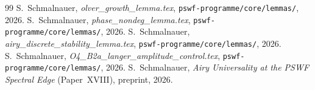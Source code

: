 \documentclass[12pt,a4paper]{amsart}
\theoremstyle{definition}
\begin{document}
\begin{thebibliography}{99}
S.~Schmalnauer,
\textit{olver\_growth\_lemma.tex},
\texttt{pswf-programme/core/lemmas/}, 2026.
S.~Schmalnauer,
\textit{phase\_nondeg\_lemma.tex},
\texttt{pswf-programme/core/lemmas/}, 2026.
S.~Schmalnauer,
\textit{airy\_discrete\_stability\_lemma.tex},
\texttt{pswf-programme/core/lemmas/}, 2026.
S.~Schmalnauer,
\textit{O4\_B2a\_langer\_amplitude\_control.tex},
\texttt{pswf-programme/core/lemmas/}, 2026.
S.~Schmalnauer,
\textit{Airy Universality at the PSWF Spectral Edge}
(Paper~XVIII), preprint, 2026.
\end{thebibliography}
\end{document}
